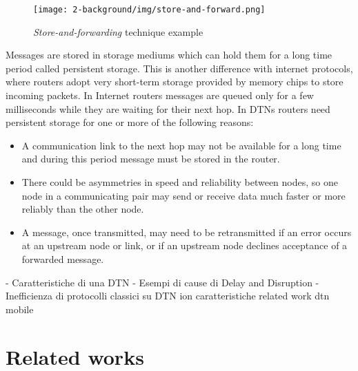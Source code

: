 \begin{figure}[htpb]
  \begin{center}
    \texttt{[image: 2-background/img/store-and-forward.png]}
    \caption{\textit{Store-and-forwarding} technique example}    
    \label{fig:store-carry-forward}
  \end{center}
\end{figure}

Messages are stored in storage mediums which can hold them for a long time period called persistent storage. This is another difference with internet protocols, where routers adopt very short-term storage provided by memory chips to store incoming packets. In Internet routers messages are queued only for a few milliseconds while they are waiting for their next hop. In DTNs routers need persistent storage for one or more of the following reasons:
\begin{itemize}
\item A communication link to the next hop may not be available for a long time and during this period message must be stored in the router.
\item There could be asymmetries in speed and reliability between nodes, so one node in a communicating pair may send or receive data much faster or more reliably than the other node.
\item A message, once transmitted, may need to be retransmitted if an error occurs at an upstream node or link, or if an upstream node declines acceptance of a forwarded message.
\end{itemize}



 
 
 


- Caratteristiche di una DTN 
   - Esempi di cause di Delay and Disruption
   - Inefficienza di protocolli classici su DTN ion caratteristiche
related work dtn mobile


\section{Related works}

